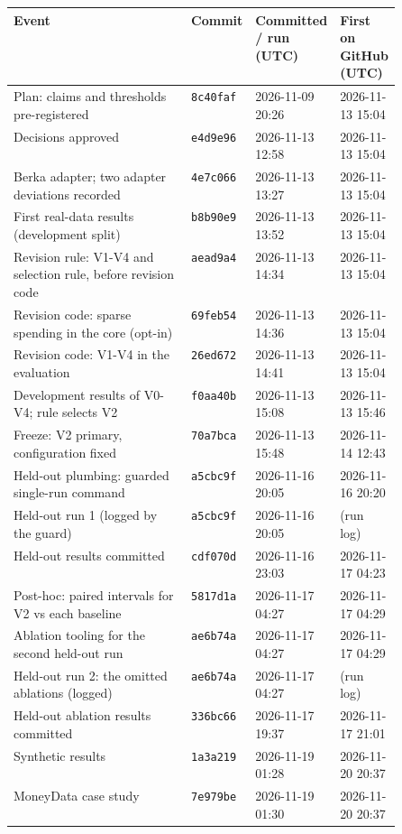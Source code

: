 \begin{tabular}{p{0.50\linewidth} l l l}
\toprule
Event & Commit & Committed / run (UTC) & First on GitHub (UTC)\\
\midrule
Plan: claims and thresholds pre-registered & \texttt{8c40faf} & 2026-11-09 20:26 & 2026-11-13 15:04 \\
Decisions approved & \texttt{e4d9e96} & 2026-11-13 12:58 & 2026-11-13 15:04 \\
Berka adapter; two adapter deviations recorded & \texttt{4e7c066} & 2026-11-13 13:27 & 2026-11-13 15:04 \\
First real-data results (development split) & \texttt{b8b90e9} & 2026-11-13 13:52 & 2026-11-13 15:04 \\
Revision rule: V1-V4 and selection rule, before revision code & \texttt{aead9a4} & 2026-11-13 14:34 & 2026-11-13 15:04 \\
Revision code: sparse spending in the core (opt-in) & \texttt{69feb54} & 2026-11-13 14:36 & 2026-11-13 15:04 \\
Revision code: V1-V4 in the evaluation & \texttt{26ed672} & 2026-11-13 14:41 & 2026-11-13 15:04 \\
Development results of V0-V4; rule selects V2 & \texttt{f0aa40b} & 2026-11-13 15:08 & 2026-11-13 15:46 \\
Freeze: V2 primary, configuration fixed & \texttt{70a7bca} & 2026-11-13 15:48 & 2026-11-14 12:43 \\
Held-out plumbing: guarded single-run command & \texttt{a5cbc9f} & 2026-11-16 20:05 & 2026-11-16 20:20 \\
Held-out run 1 (logged by the guard) & \texttt{a5cbc9f} & 2026-11-16 20:05 & (run log) \\
Held-out results committed & \texttt{cdf070d} & 2026-11-16 23:03 & 2026-11-17 04:23 \\
Post-hoc: paired intervals for V2 vs each baseline & \texttt{5817d1a} & 2026-11-17 04:27 & 2026-11-17 04:29 \\
Ablation tooling for the second held-out run & \texttt{ae6b74a} & 2026-11-17 04:27 & 2026-11-17 04:29 \\
Held-out run 2: the omitted ablations (logged) & \texttt{ae6b74a} & 2026-11-17 04:27 & (run log) \\
Held-out ablation results committed & \texttt{336bc66} & 2026-11-17 19:37 & 2026-11-17 21:01 \\
Synthetic results & \texttt{1a3a219} & 2026-11-19 01:28 & 2026-11-20 20:37 \\
MoneyData case study & \texttt{7e979be} & 2026-11-19 01:30 & 2026-11-20 20:37 \\

\end{tabular}
